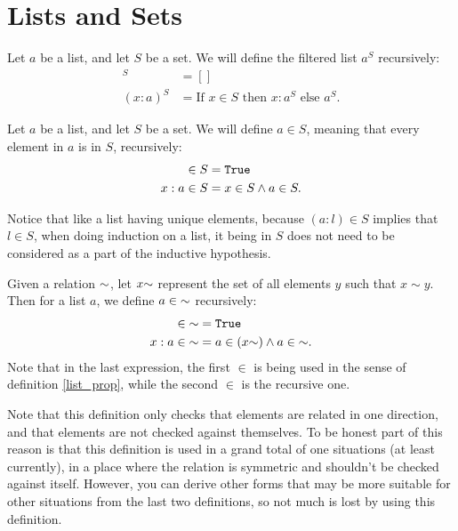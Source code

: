\documentclass[../../math.tex]{subfiles}
\begin{document}
\section{Lists and Sets}

\begin{definition}
    Let $a$ be a list, and let $S$ be a set.  We will define the filtered list
    $a^S$ recursively:
    \begin{align*}
             []^S &= [] \\
        (x : a)^S &= \text{If $x \in S$ then $x : a^S$ else $a^S$}.
    \end{align*}
\end{definition}

\begin{definition} \label{list_prop}
    Let $a$ be a list, and let $S$ be a set.  We will define $a \in S$, meaning
    that every element in $a$ is in $S$, recursively:
    \begin{align*}
           [] \in S &= \vtt{True} \\
        x : a \in S &= x \in S \wedge a \in S.
    \end{align*}
\end{definition}
\noindent Notice that like a list having unique elements, because $(a : l) \in
S$ implies that $l \in S$, when doing induction on a list, it being in $S$ does
not need to be considered as a part of the inductive hypothesis.

\begin{definition}
    Given a relation ${\sim}$, let $x {\sim}$ represent the set of all elements
    $y$ such that $x \sim y$.  Then for a list $a$, we define $a \in {\sim}$
    recursively:
    \begin{align*}
           [] \in \usim &= \vtt{True} \\
        x : a \in \usim &= a \in (x \usim) \wedge a \in \usim.
    \end{align*}
    Note that in the last expression, the first $\in$ is being used in the sense
    of definition \ref{list_prop}, while the second $\in$ is the recursive one.
\end{definition}

Note that this definition only checks that elements are related in one
direction, and that elements are not checked against themselves.  To be honest
part of this reason is that this definition is used in a grand total of one
situations (at least currently), in a place where the relation is symmetric and
shouldn't be checked against itself.  However, you can derive other forms that
may be more suitable for other situations from the last two definitions, so not
much is lost by using this definition.
\end{document}
